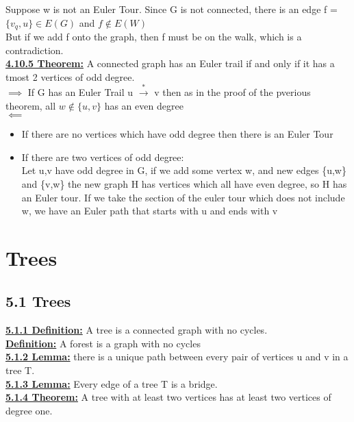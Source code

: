 \documentclass[12pt]{article}
\newcommand{\myt}[1]{\textbf{\underline{#1}}}
\begin{document}
	Suppose w is not an Euler Tour. Since G is not connected, there is an edge f = $\{v_q,u\} \in E(G)$ and $f \notin E(W)$\\
	But if we add f onto the graph, then f must be on the walk, which is a contradiction.\\
	
	\myt{4.10.5 Theorem:} A connected graph has an Euler trail if and only if it has a tmost 2 vertices of odd degree.\\
	
	$\implies$ If G has an Euler Trail u $\overset{*}{\rightarrow}$ v then as in the proof of the pverious theorem, all $w \notin \{u,v\}$ has an even degree\\
	
	$\impliedby$
	\begin{itemize}
		\item If there are no vertices which have odd degree then there is an Euler Tour
		\item If there are two vertices of odd degree:\\
		Let u,v have odd degree in G, if we add some vertex w, and new edges \{u,w\} and \{v,w\} the new graph H has vertices which all have even degree, so H has an Euler tour. If we take the section of the euler tour which does not include w, we have an Euler path that starts with u and ends with v\\
	\end{itemize}
	
	\section{Trees}
	\subsection*{5.1 Trees}
	\myt{5.1.1 Definition:} A tree is a connected graph with no cycles.\\
	\myt{Definition:} A forest is a graph with no cycles\\
	
	\myt{5.1.2 Lemma:} there is a unique path between every pair of vertices u and v in a tree T.\\
	
	\myt{5.1.3 Lemma:} Every edge of a tree T is a bridge.\\
	
	\myt{5.1.4 Theorem:} A tree with at least two vertices has at least two vertices of degree one.\\
	
\end{document}
